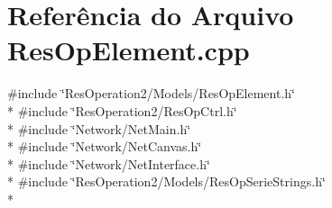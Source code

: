 \section{Referência do Arquivo Res\+Op\+Element.\+cpp}
\label{_res_op_element_8cpp}
{\ttfamily \#include \char`\"{}Res\+Operation2/\+Models/\+Res\+Op\+Element.\+h\char`\"{}}\\*
{\ttfamily \#include \char`\"{}Res\+Operation2/\+Res\+Op\+Ctrl.\+h\char`\"{}}\\*
{\ttfamily \#include \char`\"{}Network/\+Net\+Main.\+h\char`\"{}}\\*
{\ttfamily \#include \char`\"{}Network/\+Net\+Canvas.\+h\char`\"{}}\\*
{\ttfamily \#include \char`\"{}Network/\+Net\+Interface.\+h\char`\"{}}\\*
{\ttfamily \#include \char`\"{}Res\+Operation2/\+Models/\+Res\+Op\+Serie\+Strings.\+h\char`\"{}}\\*
